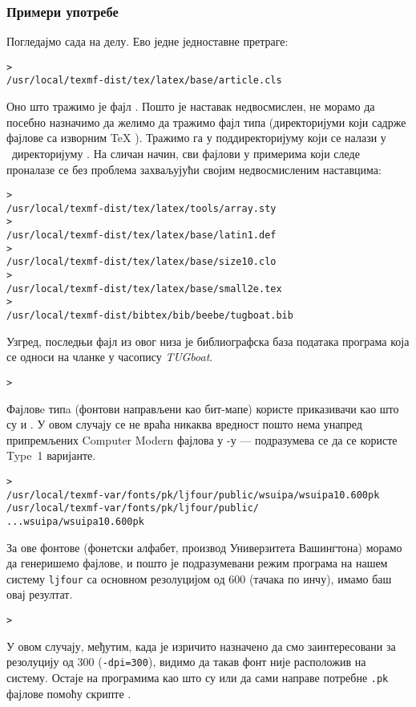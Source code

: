 \documentclass{article}
\begin{document}
\subsubsection{Примери употребе}
\label{sec:examples-of-use}

Погледајмо сада \KPS{} на делу. Ево једне једноставне претраге:

\begin{alltt}> 
   /usr/local/texmf-dist/tex/latex/base/article.cls
\end{alltt}
Оно што тражимо је фајл . Пошто је наставак
 недвосмислен, не морамо да посебно назначимо да желимо да
тражимо фајл типа  (директоријуми који садрже фајлове са
изворним \TeX{} ). Тражимо га у поддиректоријуму
 који се налази у \TL\ директоријуму
. На сличан начин, сви фајлови у примерима који следе
проналазе се без проблема захваљујући својим недвосмисленим
наставцима:
\begin{alltt}> 
   /usr/local/texmf-dist/tex/latex/tools/array.sty
> 
   /usr/local/texmf-dist/tex/latex/base/latin1.def
> 
   /usr/local/texmf-dist/tex/latex/base/size10.clo
> 
   /usr/local/texmf-dist/tex/latex/base/small2e.tex
> 
   /usr/local/texmf-dist/bibtex/bib/beebe/tugboat.bib
\end{alltt}

Узгред, последњи фајл из овог низа је библиографска база података
програма \BibTeX{} која се односи на чланке у часопису
\textsl{TUGboat}.

\begin{alltt}> 
\end{alltt}
Фајловe типa  (фонтови направљени као бит-мапе) користе
приказивачи као што су  и . У овом
случају се не враћа никаква вредност пошто нема унапред припремљених
\textenglish{Computer Modern}  фајлова у \TL{}-у ---
подразумева се да се користе Type~1 варијанте.
\begin{alltt}> 
\ifSingleColumn   /usr/local/texmf-var/fonts/pk/ljfour/public/wsuipa/wsuipa10.600pk
\else /usr/local/texmf-var/fonts/pk/ljfour/public/
...                         wsuipa/wsuipa10.600pk
\fi\end{alltt}
За ове фонтове (фонетски алфабет, производ Универзитета Вашингтона)
морамо да генеришемо  фајлове, и пошто је подразумевани
режим програма \MF{} на нашем систему \texttt{ljfour} са основном
резолуцијом од 600\dpi{} (тачака по инчу), имамо баш овај резултат.
\begin{alltt}> 
\end{alltt}
У овом случају, међутим, када је изричито назначено да смо
заинтересовани за резолуцију од 300\dpi{} (\texttt{-dpi=300}), видимо
да такав фонт није расположив на систему. Остаје на програмима као
што су  или  да сами направе потребне
\texttt{.pk} фајлове помоћу скрипте .
\end{document}
